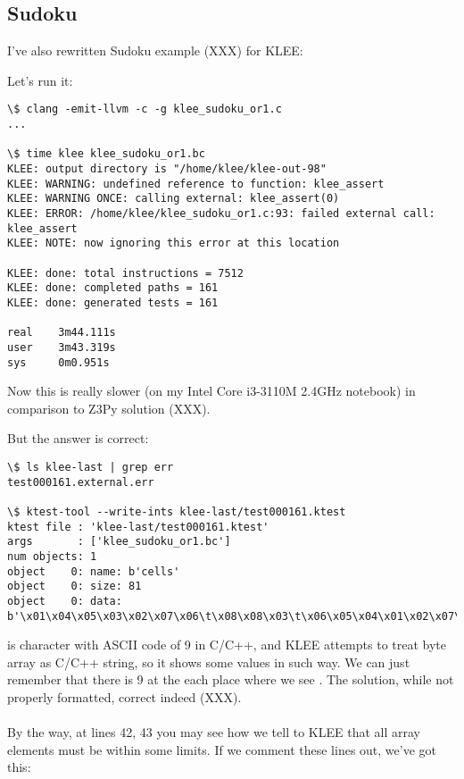 \subsection{Sudoku}

I've also rewritten Sudoku example (XXX) for KLEE: %



Let's run it:

\begin{lstlisting}
\$ clang -emit-llvm -c -g klee_sudoku_or1.c
...

\$ time klee klee_sudoku_or1.bc
KLEE: output directory is "/home/klee/klee-out-98"
KLEE: WARNING: undefined reference to function: klee_assert
KLEE: WARNING ONCE: calling external: klee_assert(0)
KLEE: ERROR: /home/klee/klee_sudoku_or1.c:93: failed external call: klee_assert
KLEE: NOTE: now ignoring this error at this location

KLEE: done: total instructions = 7512
KLEE: done: completed paths = 161
KLEE: done: generated tests = 161

real    3m44.111s
user    3m43.319s
sys     0m0.951s
\end{lstlisting}

Now this is really slower (on my Intel Core i3-3110M 2.4GHz notebook) in comparison to Z3Py solution (XXX). %

But the answer is correct:

\begin{lstlisting}
\$ ls klee-last | grep err
test000161.external.err

\$ ktest-tool --write-ints klee-last/test000161.ktest
ktest file : 'klee-last/test000161.ktest'
args       : ['klee_sudoku_or1.bc']
num objects: 1
object    0: name: b'cells'
object    0: size: 81
object    0: data: b'\x01\x04\x05\x03\x02\x07\x06\t\x08\x08\x03\t\x06\x05\x04\x01\x02\x07\x06\x07\x02\t\x01\x08\x05\x04\x03\x04\t\x06\x01\x08\x05\x03\x07\x02\x02\x01\x08\x04\x07\x03\t\x05\x06\x07\x05\x03\x02\t\x06\x04\x08\x01\x03\x06\x07\x05\x04\x02\x08\x01\t\t\x08\x04\x07\x06\x01\x02\x03\x05\x05\x02\x01\x08\x03\t\x07\x06\x04'
\end{lstlisting}

\TT{\\t} is character with ASCII code of 9 in C/C++, and KLEE attempts to treat byte array as C/C++ string, so it shows some values in such way.
We can just remember that there is 9 at the each place where we see \TT{\\t}.
The solution, while not properly formatted, correct indeed (XXX).\\ %
\\
By the way, at lines 42, 43 you may see how we tell to KLEE that all array elements must be within some limits.
If we comment these lines out, we've got this:

